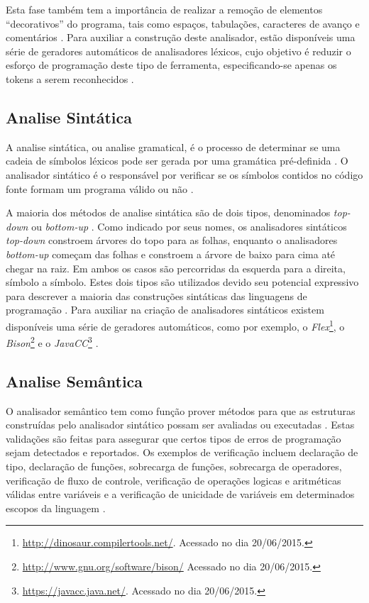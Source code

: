 Esta fase também tem a importância de realizar a remoção de elementos 
“decorativos” do programa, tais como espaços, tabulações, caracteres de 
avanço e comentários \cite[pág. 59]{ref15}. Para auxiliar a construção deste analisador,
 estão disponíveis uma série de geradores automáticos de analisadores léxicos, 
cujo objetivo é reduzir o esforço de programação deste tipo de ferramenta, 
especificando-se apenas os tokens a serem reconhecidos \cite[pág. 50]{ref18}.

\subsection{Analise Sintática}

A analise sintática, ou analise gramatical, é o processo de determinar 
se uma cadeia de símbolos léxicos pode ser gerada por uma gramática pré-definida
 \cite{ref19}. O analisador sintático é o responsável por verificar se os 
símbolos contidos no código fonte formam um programa válido ou não \cite[pág. 38]{ref20}.

A maioria dos métodos de analise sintática são de dois tipos, denominados 
\textit{top-down} ou \textit{bottom-up} \cite[pág.  227]{ref21}. Como indicado por 
seus nomes, os analisadores sintáticos \textit{top-down} constroem árvores 
do topo para as folhas, enquanto o analisadores \textit{bottom-up} começam das 
folhas e constroem a árvore de baixo para cima até chegar na raiz. Em ambos os
 casos são percorridas da esquerda para a direita, 
símbolo a símbolo. Estes dois tipos são utilizados devido seu potencial 
expressivo para descrever a maioria das construções sintáticas das linguagens 
de programação \cite[pág. 38]{ref20}. Para auxiliar na criação de analisadores sintáticos 
existem disponíveis uma série de geradores automáticos, como por exemplo, 
o \textit{Flex}\footnote{\url{http://dinosaur.compilertools.net/}. Acessado no dia 20/06/2015.}, 
o \textit{Bison}\footnote{\url{http://www.gnu.org/software/bison/} Acessado no dia 20/06/2015.}
 e o \textit{JavaCC}\footnote{\url{https://javacc.java.net/}. Acessado no dia 20/06/2015.}
 \cite[pág. 30]{ref22}.

\subsection{Analise Semântica}

O analisador semântico tem como função prover métodos para que as estruturas 
construídas pelo analisador sintático possam ser avaliadas ou executadas \cite[pág. 337]{ref23}. 
Estas validações são feitas para assegurar que certos tipos de erros de 
programação sejam detectados e reportados. Os  exemplos de verificação incluem 
declaração de tipo, declaração de funções, sobrecarga de funções, sobrecarga de 
operadores, verificação de fluxo de controle, verificação de operações logicas e 
aritméticas válidas entre variáveis e a verificação de unicidade de variáveis em 
determinados escopos da linguagem \cite[pág. 147]{ref6}.

